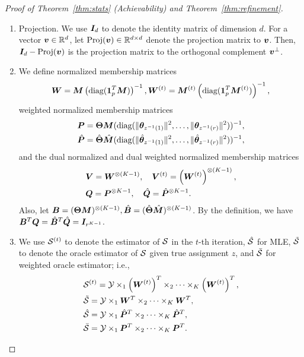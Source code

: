 \documentclass[journal]{IEEEtran}
\theoremstyle{definition}
\theoremstyle{definition}
\newcommand{\of}[1]{\left(#1\right)}
\begin{document}
\begin{proof}[Proof of Theorem~\ref{thm:stats} (Achievability) and Theorem~\ref{thm:refinement}]
{\begin{enumerate}[wide]
\item Projection. We use $\bm I_d$ to denote the identity matrix of dimension $d$. For a vector $\bm{v} \in \mathbb{R}^d$, let $\text{Proj}(\bm{v}) \in \mathbb{R}^{d \times d}$ denote the projection matrix to $\bm{v}$. Then, $\bm I_d - \text{Proj}(\bm{v})$ is the projection matrix to the orthogonal complement $\bm{v}^{\perp}$. 

    \item We define normalized membership matrices
    \small
    \begin{equation}
        \mW = \mM \of{ \text{diag}(\mone_{p}^T \mM) }^{-1}, \mW^{(t)} = \mM^{(t)} \of{ \text{diag}(\mone_{p}^T \mM^{(t)}) }^{-1},
    \end{equation}
    \normalsize
    weighted normalized membership matrices
    \begin{align}
        &\bm{P} = \boldsymbol{\Theta} \bm M ( \text{diag}( \lVert\boldsymbol{\theta}_{z^{-1}(1)}\rVert^2 , \ldots, \lVert\boldsymbol{\theta}_{z^{-1}(r)}\rVert^2 ) )^{-1}, \\
        &\hat {\bm{P}} = \hat {\boldsymbol{\Theta}} \hat {\bm M} ( \text{diag}( \lVert\hat {\boldsymbol{\theta}}_{z^{-1}(1)}\rVert^2 , \ldots, \lVert\hat {\boldsymbol{\theta}}_{z^{-1}(r)}\rVert^2 ) )^{-1},
    \end{align}
    and the dual normalized and dual weighted normalized membership matrices
    \begin{align}
         &\mV = \mW^{\otimes (K-1)}, \quad \mV^{(t)} =\of{ \mW^{(t)}}^{\otimes (K-1)},\\
         &\mQ = \mP^{\otimes K-1}, \quad  \hat \mQ = \hat \mP^{\otimes K-1}.
    \end{align}
    Also, let $\bm B = (\boldsymbol{\Theta} \bm M)^{\otimes (K-1)}, \hat {\bm B} = (\hat {\boldsymbol{\Theta}} \hat {\bm M})^{\otimes (K-1)}$. By the definition, we have $\bm B^T \bm{Q} =\hat {\bm B}^T \hat {\bm{Q}} =\bm I_{r^{K-1}}$.
    \item We use $\mathcal{S}^{(t)}$ to denote the estimator of $\mathcal{S}$ in the $t$-th iteration, $\hat {\mathcal{S}}$ for MLE, $\tilde {\mathcal{S}}$ to denote the oracle estimator of $\mathcal{S}$ given true assignment $z$, and $\bar {\mathcal{S}}$ for weighted oracle estimator; i.e.,
    \begin{align}
        &\tS^{(t)} = \tY \times_1 \of{\mW^{(t)}}^T \times_2 \cdots \times_K \of{\mW^{(t)}}^T,\\ &\tilde \tS = \tY \times_1 \mW^T \times_2 \cdots \times_K \mW^T, \\
        &\hat \tS =  \tY \times_1 \hat \mP^T \times_2 \cdots \times_K \hat \mP^T, \\
        &\bar \tS  = \tY \times_1 \mP^T \times_2 \cdots \times_K \mP^T.
    \end{align}

\end{enumerate}}
\end{proof}
\end{document}
